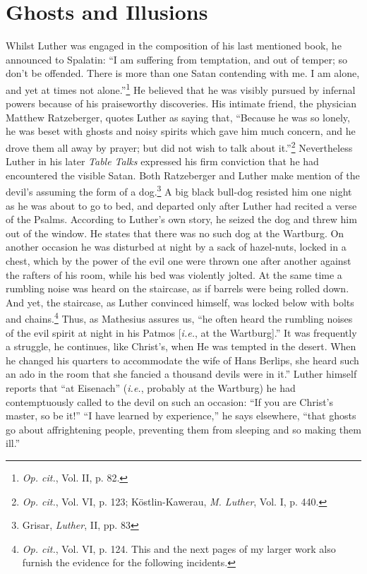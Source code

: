 \section{Ghosts and Illusions}

Whilst Luther was engaged in the composition of his last mentioned book,
he announced to Spalatin: “I am suffering from
temptation, and out of temper; so don’t be offended. There is more
than one Satan contending with me. I am alone, and yet at times not
alone.”\footnote{\textit{Op. cit.}, Vol. II, p. 82.}
He believed that he was visibly pursued by infernal powers
because of his praiseworthy discoveries. His intimate friend, the
physician Matthew Ratzeberger, quotes Luther as saying that, “Because he
was so lonely, he was beset with ghosts and noisy spirits
which gave him much concern, and he drove them all away by prayer;
but did not wish to talk about it.”\footnote{\textit{Op. cit.}, Vol. VI, p. 123; Köstlin-Kawerau, \textit{M. Luther}, Vol. I, p. 440.}
Nevertheless Luther in his later \textit{Table Talks} expressed his firm
conviction that he had encountered the visible Satan. Both Ratzeberger
and Luther make mention of the devil’s assuming the form of
a dog.\footnote{Grisar, \textit{Luther}, II, pp. 83}
A big black bull-dog resisted him one night as he was about
to go to bed, and departed only after Luther had recited a verse of
the Psalms. According to Luther’s own story, he seized the dog
and threw him out of the window. He states that there was no such
dog at the Wartburg. On another occasion he was disturbed at night
by a sack of hazel-nuts, locked in a chest, which by the power of the
evil one were thrown one after another against the rafters of his room,
while his bed was violently jolted. At the same time a rumbling noise
was heard on the staircase, as if barrels were being rolled down. And
yet, the staircase, as Luther convinced himself, was locked below with
bolts and chains.\footnote
{\textit{Op. cit.}, Vol. VI, p. 124. This and the next pages of my larger work also furnish the
evidence for the following incidents.}
Thus, as Mathesius assures us, ``he often heard the
rumbling noises of the evil spirit at night in his Patmos [\textit{i.e.}, at the
Wartburg].'' It was frequently a struggle, he continues, like Christ’s,
when He was tempted in the desert. When he changed his quarters to
accommodate the wife of Hans Berlips, she heard such an ado in the
room that she fancied a thousand devils were in it.” Luther himself
reports that “at Eisenach” (\textit{i.e.}, probably at the Wartburg) he had
contemptuously called to the devil on such an occasion: “If you are
Christ’s master, so be it!” “I have learned by experience,” he says
elsewhere, “that ghosts go about affrightening people, preventing
them from sleeping and so making them ill.”

